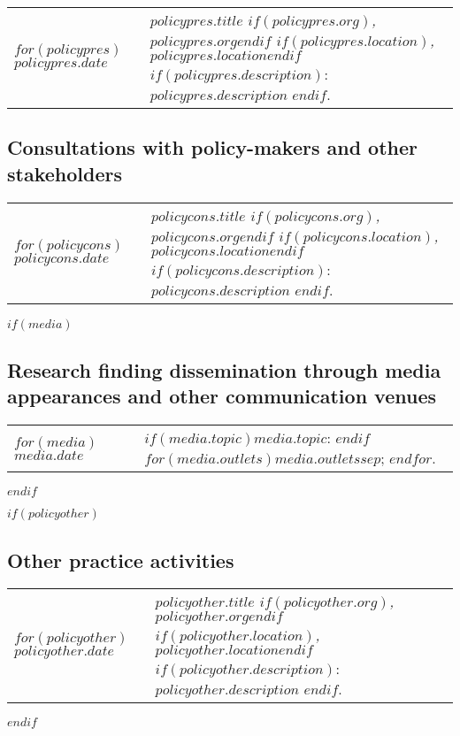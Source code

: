 \documentclass[martgin, line, 11pt]{article}
\begin{document}
\setlength{\extrarowheight}{.25em}
\begin{longtable}[l]{lp{5.5in}}   
$for(policypres)$
$policypres.date$&
\parbox[t]{5.5in}{
    \textit{$policypres.title$%
    $if(policypres.org)$, $policypres.org$$endif$%
    $if(policypres.location)$, $policypres.location$$endif$}%
    $if(policypres.description)$: %
    $policypres.description$%
    $endif$.%
  }\\
$endfor$
\end{longtable}
\setlength{\extrarowheight}{0em}

\subsection*{Consultations with policy-makers and other
  stakeholders}

\setlength{\extrarowheight}{.25em}
\begin{longtable}[l]{lp{5.5in}}   
$for(policycons)$
$policycons.date$&
\parbox[t]{5.5in}{
    \textit{$policycons.title$%
    $if(policycons.org)$, $policycons.org$$endif$%
    $if(policycons.location)$, $policycons.location$$endif$}%
    $if(policycons.description)$: %
    $policycons.description$%
    $endif$.%
  }\\
$endfor$
\end{longtable}
\setlength{\extrarowheight}{0em}

$if(media)$
\subsection*{Research finding dissemination through media appearances
  and other communication venues}

\setlength{\extrarowheight}{.5em}
\begin{longtable}[l]{lp{5in}}   
$for(media)$
$media.date$&
\parbox[t]{5in}{
    $if(media.topic)$$media.topic$: $endif$%
    $for(media.outlets)$$media.outlets$$sep$; $endfor$.%
  }\\
$endfor$
\end{longtable}
\setlength{\extrarowheight}{0em}
$endif$


$if(policyother)$
\subsection*{Other practice activities}

\setlength{\extrarowheight}{.75em}
\begin{longtable}[l]{lp{5in}}   
$for(policyother)$
$policyother.date$&
\parbox[t]{5in}{
    \textit{$policyother.title$%
    $if(policyother.org)$, $policyother.org$$endif$%
    $if(policyother.location)$, $policyother.location$$endif$}%
    $if(policyother.description)$: %
    $policyother.description$%
    $endif$.%
  }\\
$endfor$
\end{longtable}
\setlength{\extrarowheight}{0em}
$endif$
\end{document}
